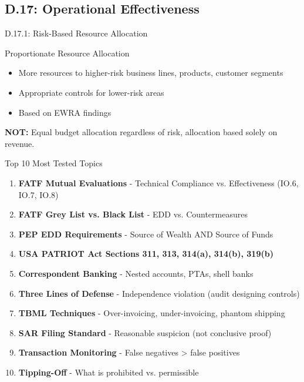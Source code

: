 \documentclass{beamer}
\begin{document}
		\subsection{D.17: Operational Effectiveness}
		
		\begin{frame}{D.17.1: Risk-Based Resource Allocation}
			\begin{block}{Proportionate Resource Allocation}
				\begin{itemize}
					\item More resources to higher-risk business lines, products, customer segments
					\item Appropriate controls for lower-risk areas
					\item Based on EWRA findings
				\end{itemize}
			\end{block}
			\textbf{NOT:} Equal budget allocation regardless of risk, allocation based solely on revenue.
		\end{frame}
		
		
		\begin{frame}{Top 10 Most Tested Topics}
			\begin{enumerate}
				\item \textbf{FATF Mutual Evaluations} - Technical Compliance vs. Effectiveness (IO.6, IO.7, IO.8)
				\item \textbf{FATF Grey List vs. Black List} - EDD vs. Countermeasures
				\item \textbf{PEP EDD Requirements} - Source of Wealth AND Source of Funds
				\item \textbf{USA PATRIOT Act Sections 311, 313, 314(a), 314(b), 319(b)}
				\item \textbf{Correspondent Banking} - Nested accounts, PTAs, shell banks
				\item \textbf{Three Lines of Defense} - Independence violation (audit designing controls)
				\item \textbf{TBML Techniques} - Over-invoicing, under-invoicing, phantom shipping
				\item \textbf{SAR Filing Standard} - Reasonable suspicion (not conclusive proof)
				\item \textbf{Transaction Monitoring} - False negatives > false positives
				\item \textbf{Tipping-Off} - What is prohibited vs. permissible
			\end{enumerate}
		\end{frame}
		
\end{document}
